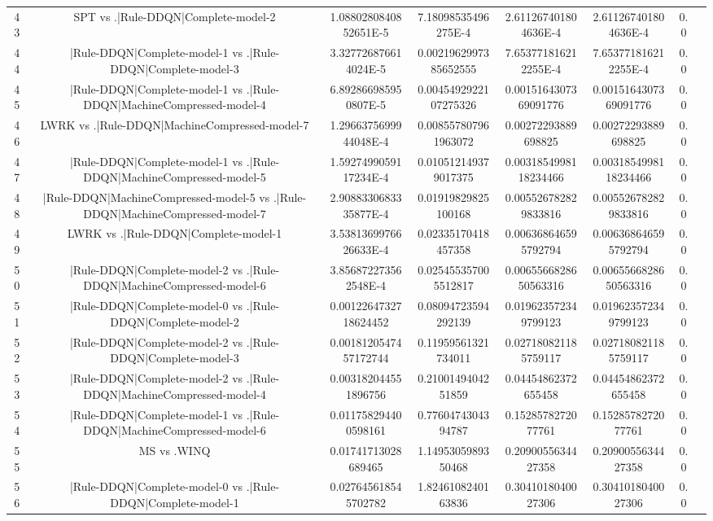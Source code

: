 \documentclass[a3paper,10pt]{article}
\begin{document}
\begin{table}[!htp]
\begin{tabular}{cccccccc}
43&SPT vs .|Rule-DDQN|Complete-model-2&1.0880280840852651E-5&7.18098535496275E-4&2.611267401804636E-4&2.611267401804636E-4&0.0\\
44&|Rule-DDQN|Complete-model-1 vs .|Rule-DDQN|Complete-model-3&3.327726876614024E-5&0.0021962997385652555&7.653771816212255E-4&7.653771816212255E-4&0.0\\
45&|Rule-DDQN|Complete-model-1 vs .|Rule-DDQN|MachineCompressed-model-4&6.892866985950807E-5&0.0045492922107275326&0.0015164307369091776&0.0015164307369091776&0.0\\
46&LWRK vs .|Rule-DDQN|MachineCompressed-model-7&1.2966375699944048E-4&0.008557807961963072&0.00272293889698825&0.00272293889698825&0.0\\
47&|Rule-DDQN|Complete-model-1 vs .|Rule-DDQN|MachineCompressed-model-5&1.5927499059117234E-4&0.010512149379017375&0.0031854998118234466&0.0031854998118234466&0.0\\
48&|Rule-DDQN|MachineCompressed-model-5 vs .|Rule-DDQN|MachineCompressed-model-7&2.9088330683335877E-4&0.01919829825100168&0.005526782829833816&0.005526782829833816&0.0\\
49&LWRK vs .|Rule-DDQN|Complete-model-1&3.5381369976626633E-4&0.02335170418457358&0.006368646595792794&0.006368646595792794&0.0\\
50&|Rule-DDQN|Complete-model-2 vs .|Rule-DDQN|MachineCompressed-model-6&3.856872273562548E-4&0.025455357005512817&0.0065566828650563316&0.0065566828650563316&0.0\\
51&|Rule-DDQN|Complete-model-0 vs .|Rule-DDQN|Complete-model-2&0.0012264732718624452&0.08094723594292139&0.019623572349799123&0.019623572349799123&0.0\\
52&|Rule-DDQN|Complete-model-2 vs .|Rule-DDQN|Complete-model-3&0.0018120547457172744&0.11959561321734011&0.027180821185759117&0.027180821185759117&0.0\\
53&|Rule-DDQN|Complete-model-2 vs .|Rule-DDQN|MachineCompressed-model-4&0.003182044551896756&0.2100149404251859&0.04454862372655458&0.04454862372655458&0.0\\
54&|Rule-DDQN|Complete-model-1 vs .|Rule-DDQN|MachineCompressed-model-6&0.011758294400598161&0.7760474304394787&0.1528578272077761&0.1528578272077761&0.0\\
55&MS vs .WINQ&0.01741713028689465&1.1495305989350468&0.2090055634427358&0.2090055634427358&0.0\\
56&|Rule-DDQN|Complete-model-0 vs .|Rule-DDQN|Complete-model-1&0.027645618545702782&1.8246108240163836&0.3041018040027306&0.3041018040027306&0.0\\

\end{tabular}
\end{table}
\end{document}
